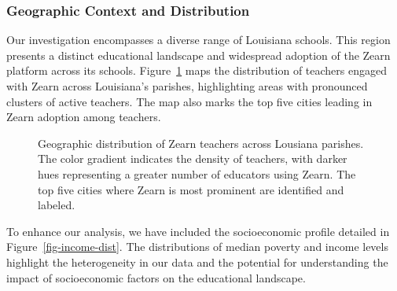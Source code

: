 \documentclass[
  number,
  preprint,
  3p,
  onecolumn]{elsarticle}
\begin{document}
\subsubsection{Geographic Context and
Distribution}\label{geographic-context-and-distribution}

Our investigation encompasses a diverse range of Louisiana schools. This
region presents a distinct educational landscape and widespread adoption
of the Zearn platform across its schools. Figure~\ref{fig-teachers-map}
maps the distribution of teachers engaged with Zearn across Louisiana's
parishes, highlighting areas with pronounced clusters of active
teachers. The map also marks the top five cities leading in Zearn
adoption among teachers.

\begin{figure}


\caption{\label{fig-teachers-map}Geographic distribution of Zearn
teachers across Lousiana parishes. The color gradient indicates the
density of teachers, with darker hues representing a greater number of
educators using Zearn. The top five cities where Zearn is most prominent
are identified and labeled.}

\end{figure}%

To enhance our analysis, we have included the socioeconomic profile
detailed in Figure~\ref{fig-income-dist}. The distributions of median
poverty and income levels highlight the heterogeneity in our data and
the potential for understanding the impact of socioeconomic factors on
the educational landscape.
\end{document}
